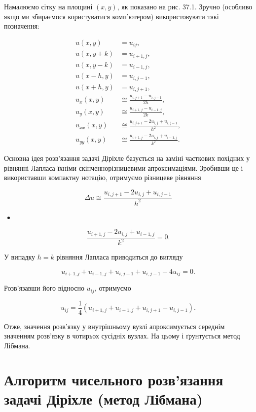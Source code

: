 \documentclass[
  ukrainian,
]{article}
\providecommand{\tightlist}{%
  \setlength{\itemsep}{0pt}\setlength{\parskip}{0pt}}
\begin{document}
Намалюємо сітку на площині \((x,y)\), як показано на рис. 37.1. Зручно
(особливо якщо ми збираємося користуватися комп'ютером) використовувати
такі позначення:

\[
\begin{aligned}
u(x,y)&=u_{ij},\\
u(x,y+k)&=u_{i+1,j},\\
u(x,y-k)&=u_{i-1,j},\\
u(x-h,y)&=u_{i,j-1},\\
u(x+h,y)&=u_{i,j+1},\\
u_x(x,y)&\cong \frac{u_{i,j+1}-u_{i,j-1}}{2h},\\
u_y(x,y)&\cong \frac{u_{i+1,j}-u_{i-1,j}}{2k},\\
u_{xx}(x,y)&\cong \frac{u_{i,j+1}-2u_{i,j}+u_{i,j-1}}{h^2},\\
u_{yy}(x,y)&\cong \frac{u_{i+1,j}-2u_{i,j}+u_{i-1,j}}{k^2}.
\end{aligned}
\]

Основна ідея розв'язання задачі Діріхле базується на заміні часткових
похідних у рівнянні Лапласа їхніми скінченнорізницевими апроксимаціями.
Зробивши це і використавши компактну нотацію, отримуємо різницеве
рівняння

\[
\Delta u \cong
\frac{u_{i,j+1}-2u_{i,j}+u_{i,j-1}}{h^2}
\]

\begin{itemize}
\tightlist
\item
\end{itemize}

\[
\frac{u_{i+1,j}-2u_{i,j}+u_{i-1,j}}{k^2}
=0.
\]

У випадку \(h=k\) рівняння Лапласа приводиться до вигляду

\[
u_{i+1,j}+u_{i-1,j}+u_{i,j+1}+u_{i,j-1}-4u_{ij}=0.
\]

Розв'язавши його відносно \(u_{ij}\), отримуємо

\[
u_{ij}=\frac{1}{4}\left(u_{i+1,j}+u_{i-1,j}+u_{i,j+1}+u_{i,j-1}\right).
\]

Отже, значення розв'язку у внутрішньому вузлі апроксимується середнім
значенням розв'язку в чотирьох сусідніх вузлах. На цьому і ґрунтується
метод Лібмана.

\section{Алгоритм чисельного розв'язання задачі Діріхле (метод
Лібмана)}\label{ux430ux43bux433ux43eux440ux438ux442ux43c-ux447ux438ux441ux435ux43bux44cux43dux43eux433ux43e-ux440ux43eux437ux432ux44fux437ux430ux43dux43dux44f-ux437ux430ux434ux430ux447ux456-ux434ux456ux440ux456ux445ux43bux435-ux43cux435ux442ux43eux434-ux43bux456ux431ux43cux430ux43dux430}
\end{document}
